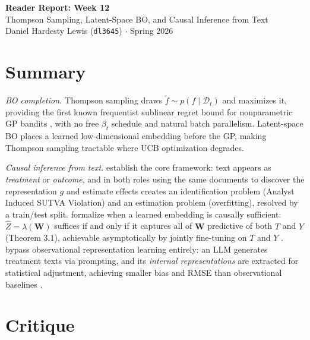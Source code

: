 \documentclass[11pt,twoside]{article}
\begin{document}
\vspace*{-1.5cm}
\begin{center}
{\Large \textbf{Reader Report: Week 12}} \\
\vspace{0.2em}
{\large Thompson Sampling, Latent-Space BO, and Causal Inference from Text} \\
\vspace{0.3em}
Daniel Hardesty Lewis (\texttt{dl3645}) $\cdot$ Spring 2026
\end{center}
\vspace{-1.5em}
\thispagestyle{fancy}

\section*{Summary}

\textit{BO completion.} Thompson sampling draws $\tilde{f} \sim p(f \mid \mathcal{D}_t)$ and maximizes it, providing the first known frequentist sublinear regret bound for nonparametric GP bandits \citep{chowdhury2017kernelized}, with no free $\beta_t$ schedule and natural batch parallelism. Latent-space BO places a learned low-dimensional embedding before the GP, making Thompson sampling tractable where UCB optimization degrades.

\textit{Causal inference from text.} \citet{egami2022texts} establish the core framework: text appears as \textit{treatment} or \textit{outcome}, and in both roles using the same documents to discover the representation $g$ and estimate effects creates an identification problem (Analyst Induced SUTVA Violation) and an estimation problem (overfitting), resolved by a train/test split. \citet{veitch2020adapting} formalize when a learned embedding is causally sufficient: $\hat{Z} = \lambda(\mathbf{W})$ suffices if and only if it captures all of $\mathbf{W}$ predictive of both $T$ and $Y$ (Theorem 3.1), achievable asymptotically by jointly fine-tuning on $T$ and $Y$ \citep[cf.][]{sridhar2022commentary,feder2022causal}. \citet{imai2024gpi} bypass observational representation learning entirely: an LLM generates treatment texts via prompting, and its \textit{internal representations} are extracted for statistical adjustment, achieving smaller bias and RMSE than observational baselines \citep[cf.][]{feldman2026sae}.

\section*{Critique}
\end{document}
